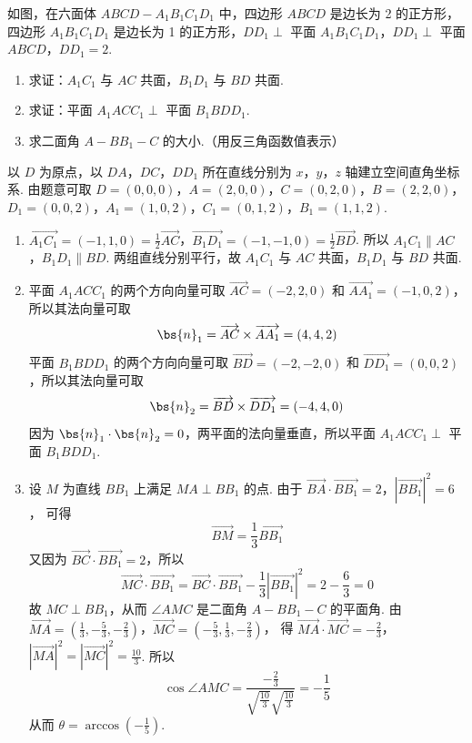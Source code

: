 \begin{problem}
如图，在六面体 \(ABCD - A_{1}B_{1}C_{1}D_{1}\) 中，四边形 \(ABCD\) 是边长为 2 的正方形，四边形 \(A_{1}B_{1}C_{1}D_{1}\) 是边长为 1 的正方形，\(DD_{1} \perp\) 平面 \(A_{1}B_{1}C_{1}D_{1}\)，\(DD_{1} \perp\) 平面 \(ABCD\)，\(DD_{1} = 2\).

\begin{enumerate}
\item 求证：\(A_{1}C_{1}\) 与 \(AC\) 共面，\(B_{1}D_{1}\) 与 \(BD\) 共面.
\item 求证：平面 \(A_{1}ACC_{1} \perp\) 平面 \(B_{1}BDD_{1}\).
\item 求二面角 \(A - BB_{1} - C\) 的大小.（用反三角函数值表示）
\end{enumerate}

\end{problem}

\begin{solution}
以 \(D\) 为原点，以 \(DA\)，\(DC\)，\(DD_1\) 所在直线分别为 \(x\)，\(y\)，\(z\) 轴建立空间直角坐标系. 由题意可取
\(D=(0,0,0)\)，\(A=(2,0,0)\)，\(C=(0,2,0)\)，\(B=(2,2,0)\)，
\(D_1=(0,0,2)\)，\(A_1=(1,0,2)\)，\(C_1=(0,1,2)\)，\(B_1=(1,1,2)\).
\begin{enumerate}
\item
\(\overrightarrow{A_1C_1}=(-1,1,0)=\frac12\overrightarrow{AC}\)，\(\overrightarrow{B_1D_1}=(-1,-1,0)=\frac12\overrightarrow{BD}\).
所以 \(A_1C_1\parallel AC\)，\(B_1D_1\parallel BD\). 两组直线分别平行，故 \(A_1C_1\) 与 \(AC\) 共面，\(B_1D_1\) 与 \(BD\) 共面.

\item 平面 \(A_1ACC_1\) 的两个方向向量可取 \(\overrightarrow{AC}=(-2,2,0)\) 和 \(\overrightarrow{AA_1}=(-1,0,2)\)，所以其法向量可取
\[
\bs{n}_1=\overrightarrow{AC}\times\overrightarrow{AA_1}=(4,4,2)
\]
平面 \(B_1BDD_1\) 的两个方向向量可取 \(\overrightarrow{BD}=(-2,-2,0)\) 和 \(\overrightarrow{DD_1}=(0,0,2)\)，所以其法向量可取
\[
\bs{n}_2=\overrightarrow{BD}\times\overrightarrow{DD_1}=(-4,4,0)
\]
因为 \(\bs{n}_1\cdot\bs{n}_2=0\)，两平面的法向量垂直，所以平面 \(A_1ACC_1\perp\) 平面 \(B_1BDD_1\).

\item
设 \(M\) 为直线 \(BB_1\) 上满足 \(MA\perp BB_1\) 的点. 由于
\(\overrightarrow{BA}\cdot\overrightarrow{BB_1}=2\)，\(|\overrightarrow{BB_1}|^2=6\)，
可得
\[
\overrightarrow{BM}=\frac13\overrightarrow{BB_1}
\]
又因为 \(\overrightarrow{BC}\cdot\overrightarrow{BB_1}=2\)，所以
\[
\overrightarrow{MC}\cdot\overrightarrow{BB_1}
=\overrightarrow{BC}\cdot\overrightarrow{BB_1}
-\frac13|\overrightarrow{BB_1}|^2
=2-\frac{6}{3}=0
\]
故 \(MC\perp BB_1\)，从而 \(\angle AMC\) 是二面角 \(A-BB_1-C\) 的平面角. 由
\(\overrightarrow{MA}=\left(\frac13,-\frac53,-\frac23\right)\)，\(\overrightarrow{MC}=\left(-\frac53,\frac13,-\frac23\right)\)，
得
\(\overrightarrow{MA}\cdot\overrightarrow{MC}=-\frac23\)，\(|\overrightarrow{MA}|^2=|\overrightarrow{MC}|^2=\frac{10}{3}\).
所以
\[
\cos\angle AMC=\frac{-\frac23}{\sqrt{\frac{10}{3}}\sqrt{\frac{10}{3}}}=-\frac15
\]
从而 \(\theta=\arccos\left(-\frac15\right)\).
\end{enumerate}
\end{solution}

